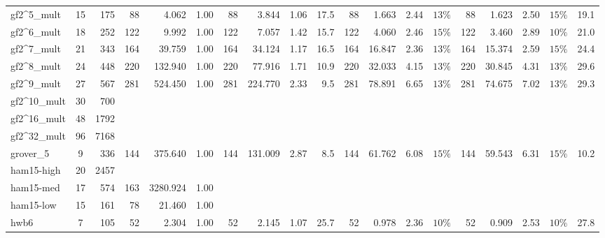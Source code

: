\begin{table}[H]
\begin{tabular}{l c r | r r r | r r r r | r r r c | r r r c r}
gf2\textasciicircum5\_mult & 15 & 175 & \cellcolor{bestT}88 & 4.062 & 1.00 & \cellcolor{bestT}88 & 3.844 & 1.06 & 17.5 & \cellcolor{bestT}88 & 1.663 & 2.44 & $13\%$ & \cellcolor{bestT}88 & 1.623 & \cellcolor{bestTime}2.50 & $15\%$ & 19.1 \\
gf2\textasciicircum6\_mult & 18 & 252 & \cellcolor{bestT}122 & 9.992 & 1.00 & \cellcolor{bestT}122 & 7.057 & 1.42 & 15.7 & \cellcolor{bestT}122 & 4.060 & 2.46 & $15\%$ & \cellcolor{bestT}122 & 3.460 & \cellcolor{bestTime}2.89 & $10\%$ & 21.0 \\
gf2\textasciicircum7\_mult & 21 & 343 & \cellcolor{bestT}164 & 39.759 & 1.00 & \cellcolor{bestT}164 & 34.124 & 1.17 & 16.5 & \cellcolor{bestT}164 & 16.847 & 2.36 & $13\%$ & \cellcolor{bestT}164 & 15.374 & \cellcolor{bestTime}2.59 & $15\%$ & 24.4 \\
gf2\textasciicircum8\_mult & 24 & 448 & \cellcolor{bestT}220 & 132.940 & 1.00 & \cellcolor{bestT}220 & 77.916 & 1.71 & 10.9 & \cellcolor{bestT}220 & 32.033 & 4.15 & $13\%$ & \cellcolor{bestT}220 & 30.845 & \cellcolor{bestTime}4.31 & $13\%$ & 29.6 \\
gf2\textasciicircum9\_mult & 27 & 567 & \cellcolor{bestT}281 & 524.450 & 1.00 & \cellcolor{bestT}281 & 224.770 & 2.33 & 9.5 & \cellcolor{bestT}281 & 78.891 & 6.65 & $13\%$ & \cellcolor{bestT}281 & 74.675 & \cellcolor{bestTime}7.02 & $13\%$ & 29.3 \\
gf2\textasciicircum10\_mult & 30 & 700 &  &  &  &  &  &  &  &  &  &  &  &  &  &  &  &  \\
gf2\textasciicircum16\_mult & 48 & 1792 &  &  &  &  &  &  &  &  &  &  &  &  &  &  &  &  \\
gf2\textasciicircum32\_mult & 96 & 7168 &  &  &  &  &  &  &  &  &  &  &  &  &  &  &  &  \\
grover\_5 & 9 & 336 & \cellcolor{bestT}144 & 375.640 & 1.00 & \cellcolor{bestT}144 & 131.009 & 2.87 & 8.5 & \cellcolor{bestT}144 & 61.762 & 6.08 & $15\%$ & \cellcolor{bestT}144 & 59.543 & \cellcolor{bestTime}6.31 & $15\%$ & 10.2 \\
ham15-high & 20 & 2457 &  &  &  &  &  &  &  &  &  &  &  &  &  &  &  &  \\
ham15-med & 17 & 574 & \cellcolor{bestT}163 & 3280.924 & \cellcolor{bestTime}1.00 &  &  &  &  &  &  &  &  &  &  &  &  &  \\
ham15-low & 15 & 161 & \cellcolor{bestT}78 & 21.460 & \cellcolor{bestTime}1.00 &  &  &  &  &  &  &  &  &  &  &  &  &  \\
hwb6 & 7 & 105 & \cellcolor{bestT}52 & 2.304 & 1.00 & \cellcolor{bestT}52 & 2.145 & 1.07 & 25.7 & \cellcolor{bestT}52 & 0.978 & 2.36 & $10\%$ & \cellcolor{bestT}52 & 0.909 & \cellcolor{bestTime}2.53 & $10\%$ & 27.8 \\

\end{tabular}
\end{table}
